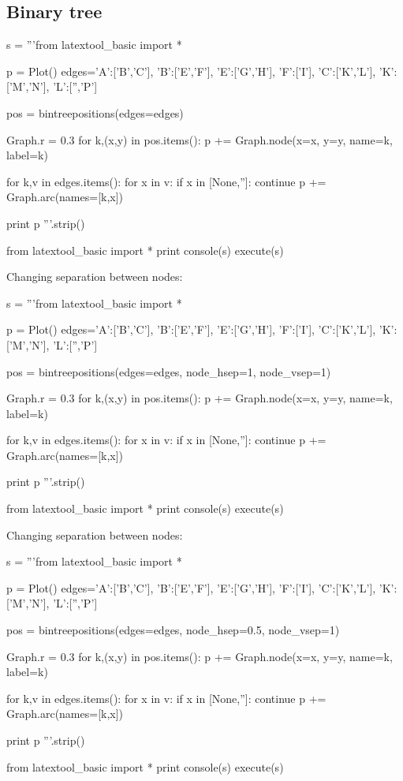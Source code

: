 \subsection{Binary tree}

\begin{python}
s = '''from latextool_basic import *

p = Plot()
edges={'A':['B','C'],
       'B':['E','F'],
       'E':['G','H'],
       'F':['I'],
       'C':['K','L'],
       'K':['M','N'],
       'L':['','P']}
     
pos = bintreepositions(edges=edges)

Graph.r = 0.3
for k,(x,y) in pos.items():
    p += Graph.node(x=x, y=y, name=k, label=k)

for k,v in edges.items():
    for x in v:
        if x in [None,'']: continue
        p += Graph.arc(names=[k,x])

print p
'''.strip()

from latextool_basic import *
print console(s)
execute(s)
\end{python}





\newpage
Changing separation between nodes:
\begin{python}
s = '''from latextool_basic import *

p = Plot()
edges={'A':['B','C'],
       'B':['E','F'],
       'E':['G','H'],
       'F':['I'],
       'C':['K','L'],
       'K':['M','N'],
       'L':['','P']}
     
pos = bintreepositions(edges=edges, node_hsep=1, node_vsep=1)

Graph.r = 0.3
for k,(x,y) in pos.items():
    p += Graph.node(x=x, y=y, name=k, label=k)

for k,v in edges.items():
    for x in v:
        if x in [None,'']: continue
        p += Graph.arc(names=[k,x])

print p
'''.strip()

from latextool_basic import *
print console(s)
execute(s)
\end{python}




\newpage
Changing separation between nodes:
\begin{python}
s = '''from latextool_basic import *

p = Plot()
edges={'A':['B','C'],
       'B':['E','F'],
       'E':['G','H'],
       'F':['I'],
       'C':['K','L'],
       'K':['M','N'],
       'L':['','P']}
     
pos = bintreepositions(edges=edges, node_hsep=0.5, node_vsep=1)

Graph.r = 0.3
for k,(x,y) in pos.items():
    p += Graph.node(x=x, y=y, name=k, label=k)

for k,v in edges.items():
    for x in v:
        if x in [None,'']: continue
        p += Graph.arc(names=[k,x])

print p
'''.strip()

from latextool_basic import *
print console(s)
execute(s)
\end{python}



